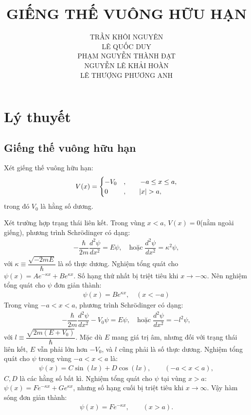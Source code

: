 \documentclass{article}
\title{\Huge{GIẾNG THẾ VUÔNG HỮU HẠN}}
\begin{document}
	\setlength{\parindent}{20pt}
	\newpage
	\author{TRẦN KHÔI NGUYÊN \\LÊ QUỐC DUY \\ PHẠM NGUYỄN THÀNH ĐẠT \\NGUYỄN LÊ KHẢI HOÀN \\ LÊ THƯỢNG PHƯƠNG ANH}
	\maketitle
	\newpage
	\section{Lý thuyết}
	\subsection{Giếng thế vuông hữu hạn}
	Xét giếng thế vuông hữu hạn:
	\begin{align}
		V(x) = 
		\begin{cases}
			-V_0 &, \quad \quad -a  \leq x \leq a ,\\ 
			0    &, \quad \quad \abs{x} > a,
		\end{cases}
	\end{align}
	trong đó $V_0$ là hằng số dương.
	
	Xét trường hợp trạng thái liên kết. Trong vùng $x<a$, $V(x) = 0$(nằm ngoài giếng), phương trình Schr\"{o}dinger có dạng:
	\begin{align}
		-\dfrac{\hbar}{2m}\dfrac{d^2\psi}{dx^2} = E \psi, \quad \text{hoặc} \; \dfrac{d^2\psi}{dx^2} = \kappa^2 \psi,
	\end{align}
	với $\kappa \equiv \dfrac{\sqrt{-2mE}}{\hbar}$ là số thực dương. Nghiệm tổng quát cho $\psi(x) = A e^{-\kappa x} + B e^{\kappa x}$. Số hạng thứ nhất bị triệt tiêu khi $x \rightarrow -\infty$. Nên nghiệm tổng quát cho $\psi$ đơn giản thành:
	\begin{align}
		\psi(x) = B e^{\kappa x} , \quad(x< -a)
	\end{align}
	Trong vùng $-a < x < a$, phương trình Schr\"{o}dinger có dạng:
	\begin{align}
		-\dfrac{\hbar}{2m}\dfrac{d^2\psi}{dx^2} - V_0 \psi = E \psi, \quad \text{hoặc} \; \dfrac{d^2\psi}{dx^2} = -l^2 \psi,
	\end{align}
	với $l \equiv \dfrac{\sqrt{2m(E + V_0)}}{\hbar}$. Mặc dù $E$ mang giá trị âm, nhưng đối với trạng thái liên kết, $E$ vẫn phải lớn hơn $-V_0$, và $l$ cũng phải là số thực dương. Nghiệm tổng quát cho $\psi$ trong vùng $-a < x < a$ là:
	\begin{align}
		\psi(x) = C \sin (lx) + D \cos (lx) , \quad \quad ( -a < x < a),
	\end{align}
	$C,D$ là các hằng số bất kì. Nghiệm tổng quát cho $\psi$ tại vùng $x>a$: $\psi(x) = F e^{-\kappa x} + G e^{\kappa x}$, nhưng số hạng cuối bị triệt tiêu khi $x \rightarrow \infty$. Vậy hàm sóng đơn giản thành:
	\begin{align}
		\psi(x) = F e^{-\kappa x}, \quad \quad (x>a).
	\end{align}
	
\end{document}
